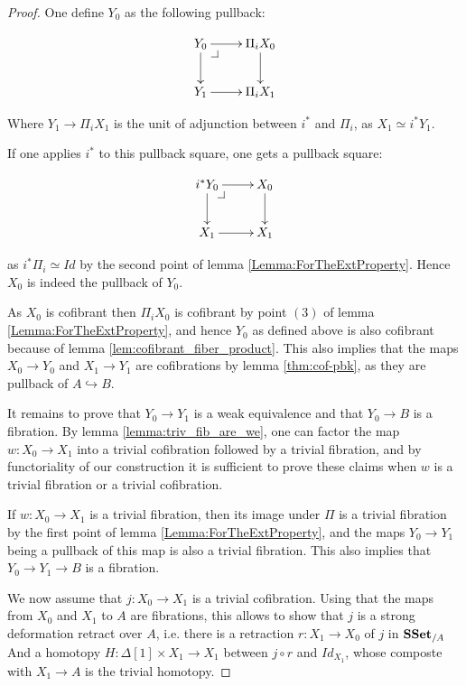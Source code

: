\documentclass[reqno,10pt,a4paper,oneside,draft]{amsart}
\begin{document}
\begin{proof}
 
One define $Y_0$ as the following pullback:

\[\xymatrix{
Y_0 \ar[d] \ar[r] \drpullback & \Pi_i X_0 \ar[d] \\
Y_1 \ar[r] & \Pi_i X_1
}\]

Where $Y_1 \rightarrow \Pi_i X_1$ is the unit of adjunction between $i^*$ and $\Pi_i$, as $X_1 \simeq i^* Y_1$.

If one applies $i^*$ to this pullback square, one gets a pullback square:


\[\xymatrix{
i^* Y_0 \ar[d] \ar[r] \drpullback & X_0 \ar[d] \\
X_1 \ar[r] & X_1
}\]

as $i^* \Pi_i \simeq Id$ by the second point of lemma \ref{Lemma:ForTheExtProperty}. Hence $X_0$ is indeed the pullback of $Y_0$.


As $X_0$ is cofibrant then $\Pi_i X_0$ is cofibrant by point $(3)$ of lemma \ref{Lemma:ForTheExtProperty}, and hence $Y_0$ as defined above is also cofibrant because of lemma \ref{lem:cofibrant_fiber_product}. This also implies that the maps $X_0 \rightarrow Y_0$ and $X_1 \rightarrow Y_1$ are cofibrations by lemma \ref{thm:cof-pbk}, as they are pullback of $A \hookrightarrow B$.





It remains to prove that $Y_0 \rightarrow Y_1$ is a weak equivalence and that $Y_0 \rightarrow B$ is a fibration. By lemma \ref{lemma:triv_fib_are_we}, one can factor the map $w:X_0 \rightarrow X_1$ into a trivial cofibration followed by a trivial fibration, and by functoriality of our construction it is sufficient to prove these claims when $w$ is a trivial fibration or a trivial cofibration.

If $w:X_0 \rightarrow X_1$ is a trivial fibration, then its image under $\Pi$ is a trivial fibration by the first point of lemma \ref{Lemma:ForTheExtProperty}, and the maps $Y_0 \rightarrow Y_1$ being a pullback of this map is also a trivial fibration. This also implies that $Y_0 \rightarrow Y_1 \rightarrow B$ is a fibration.


We now assume that $j:X_0 \rightarrow X_1$ is a trivial cofibration. Using that the maps from $X_0$ and $X_1$ to $A$ are fibrations, this allows to show that $j$ is a strong deformation retract over $A$, i.e. there is a retraction $r:X_1 \rightarrow X_0$ of $j$ in $\mathbf{SSet}_{/A}$ And a homotopy $H: \Delta[1] \times X_1 \rightarrow X_1$ between $j \circ r$ and $Id_{X_1}$, whose composte with $X_1 \rightarrow A$ is the trivial homotopy.


\end{proof}
\end{document}

